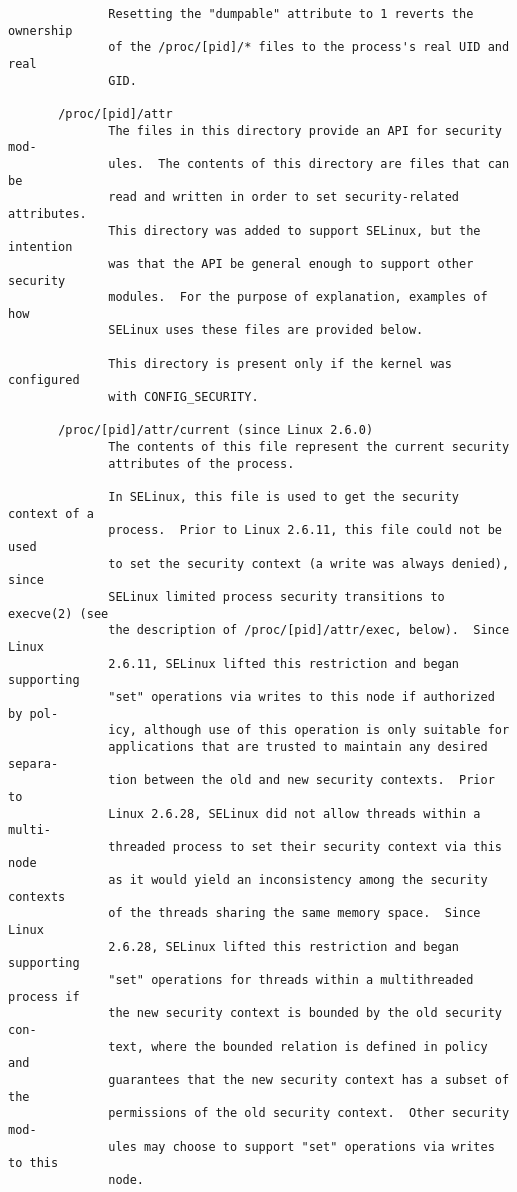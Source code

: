 \documentclass[]{article}
\begin{document}
\begin{verbatim}
              Resetting the "dumpable" attribute to 1 reverts the ownership
              of the /proc/[pid]/* files to the process's real UID and real
              GID.

       /proc/[pid]/attr
              The files in this directory provide an API for security mod‐
              ules.  The contents of this directory are files that can be
              read and written in order to set security-related attributes.
              This directory was added to support SELinux, but the intention
              was that the API be general enough to support other security
              modules.  For the purpose of explanation, examples of how
              SELinux uses these files are provided below.

              This directory is present only if the kernel was configured
              with CONFIG_SECURITY.

       /proc/[pid]/attr/current (since Linux 2.6.0)
              The contents of this file represent the current security
              attributes of the process.

              In SELinux, this file is used to get the security context of a
              process.  Prior to Linux 2.6.11, this file could not be used
              to set the security context (a write was always denied), since
              SELinux limited process security transitions to execve(2) (see
              the description of /proc/[pid]/attr/exec, below).  Since Linux
              2.6.11, SELinux lifted this restriction and began supporting
              "set" operations via writes to this node if authorized by pol‐
              icy, although use of this operation is only suitable for
              applications that are trusted to maintain any desired separa‐
              tion between the old and new security contexts.  Prior to
              Linux 2.6.28, SELinux did not allow threads within a multi-
              threaded process to set their security context via this node
              as it would yield an inconsistency among the security contexts
              of the threads sharing the same memory space.  Since Linux
              2.6.28, SELinux lifted this restriction and began supporting
              "set" operations for threads within a multithreaded process if
              the new security context is bounded by the old security con‐
              text, where the bounded relation is defined in policy and
              guarantees that the new security context has a subset of the
              permissions of the old security context.  Other security mod‐
              ules may choose to support "set" operations via writes to this
              node.


\end{verbatim}
\end{document}
